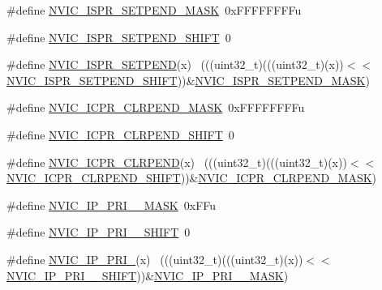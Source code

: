 \begin{DoxyCompactItemize}
\item 
\#define \hyperlink{group___n_v_i_c___register___masks_ga0dfd5e3a045907297c9dd71464796792}{N\+V\+I\+C\+\_\+\+I\+S\+P\+R\+\_\+\+S\+E\+T\+P\+E\+N\+D\+\_\+\+M\+A\+SK}~0x\+F\+F\+F\+F\+F\+F\+F\+Fu
\item 
\#define \hyperlink{group___n_v_i_c___register___masks_ga67398055aa260b7d62bdcb6c7e1aa202}{N\+V\+I\+C\+\_\+\+I\+S\+P\+R\+\_\+\+S\+E\+T\+P\+E\+N\+D\+\_\+\+S\+H\+I\+FT}~0
\item 
\#define \hyperlink{group___n_v_i_c___register___masks_ga482c043a170912b0f33d89a75f340fdc}{N\+V\+I\+C\+\_\+\+I\+S\+P\+R\+\_\+\+S\+E\+T\+P\+E\+ND}(x)                                      ~(((uint32\+\_\+t)(((uint32\+\_\+t)(x))$<$$<$\hyperlink{group___n_v_i_c___register___masks_ga67398055aa260b7d62bdcb6c7e1aa202}{N\+V\+I\+C\+\_\+\+I\+S\+P\+R\+\_\+\+S\+E\+T\+P\+E\+N\+D\+\_\+\+S\+H\+I\+FT}))\&\hyperlink{group___n_v_i_c___register___masks_ga0dfd5e3a045907297c9dd71464796792}{N\+V\+I\+C\+\_\+\+I\+S\+P\+R\+\_\+\+S\+E\+T\+P\+E\+N\+D\+\_\+\+M\+A\+SK})
\item 
\#define \hyperlink{group___n_v_i_c___register___masks_ga16ce69a282193dc237cb2a889a314ad2}{N\+V\+I\+C\+\_\+\+I\+C\+P\+R\+\_\+\+C\+L\+R\+P\+E\+N\+D\+\_\+\+M\+A\+SK}~0x\+F\+F\+F\+F\+F\+F\+F\+Fu
\item 
\#define \hyperlink{group___n_v_i_c___register___masks_ga6391b14d641916849bb245233f7689c2}{N\+V\+I\+C\+\_\+\+I\+C\+P\+R\+\_\+\+C\+L\+R\+P\+E\+N\+D\+\_\+\+S\+H\+I\+FT}~0
\item 
\#define \hyperlink{group___n_v_i_c___register___masks_ga2bb3c4fb6a79c518df75a22d9cb1b256}{N\+V\+I\+C\+\_\+\+I\+C\+P\+R\+\_\+\+C\+L\+R\+P\+E\+ND}(x)                                      ~(((uint32\+\_\+t)(((uint32\+\_\+t)(x))$<$$<$\hyperlink{group___n_v_i_c___register___masks_ga6391b14d641916849bb245233f7689c2}{N\+V\+I\+C\+\_\+\+I\+C\+P\+R\+\_\+\+C\+L\+R\+P\+E\+N\+D\+\_\+\+S\+H\+I\+FT}))\&\hyperlink{group___n_v_i_c___register___masks_ga16ce69a282193dc237cb2a889a314ad2}{N\+V\+I\+C\+\_\+\+I\+C\+P\+R\+\_\+\+C\+L\+R\+P\+E\+N\+D\+\_\+\+M\+A\+SK})
\item 
\#define \hyperlink{group___n_v_i_c___register___masks_ga6cee347aa0bb97ccc21803927e8d30eb}{N\+V\+I\+C\+\_\+\+I\+P\+\_\+\+P\+R\+I\+\_\+\_\+\+M\+A\+SK}~0x\+F\+Fu
\item 
\#define \hyperlink{group___n_v_i_c___register___masks_gaef770ca3c368b767bc1210e8363ff0f7}{N\+V\+I\+C\+\_\+\+I\+P\+\_\+\+P\+R\+I\+\_\+\_\+\+S\+H\+I\+FT}~0
\item 
\#define \hyperlink{group___n_v_i_c___register___masks_ga1af16c2c53f21d0223282b3809c1c808}{N\+V\+I\+C\+\_\+\+I\+P\+\_\+\+P\+R\+I\+\_}(x)                                              ~(((uint32\+\_\+t)(((uint32\+\_\+t)(x))$<$$<$\hyperlink{group___n_v_i_c___register___masks_gaef770ca3c368b767bc1210e8363ff0f7}{N\+V\+I\+C\+\_\+\+I\+P\+\_\+\+P\+R\+I\+\_\+\_\+\+S\+H\+I\+FT}))\&\hyperlink{group___n_v_i_c___register___masks_ga6cee347aa0bb97ccc21803927e8d30eb}{N\+V\+I\+C\+\_\+\+I\+P\+\_\+\+P\+R\+I\+\_\+\_\+\+M\+A\+SK})
$$
\end{DoxyCompactItemize}

